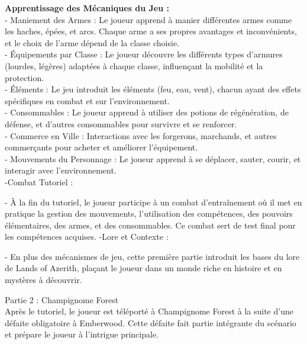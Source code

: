   \textbf{Apprentissage des Mécaniques du Jeu : }
  \\

  - Maniement des Armes : Le joueur apprend à manier différentes armes comme les haches, épées, et arcs. Chaque arme a ses propres avantages et inconvénients, et le choix de l'arme dépend de la classe choisie. 
\\

  - Équipements par Classe : Le joueur découvre les différents types d'armures (lourdes, légères) adaptées à chaque classe, influençant la mobilité et la protection. 
\\

  - Éléments : Le jeu introduit les éléments (feu, eau, vent), chacun ayant des effets spécifiques en combat et sur l'environnement. 
\\

  - Consommables : Le joueur apprend à utiliser des potions de régénération, de défense, et d'autres consommables pour survivre et se renforcer. 
\\

  - Commerce en Ville : Interactions avec les forgerons, marchands, et autres commerçants pour acheter et améliorer l'équipement. 
\\

  -  Mouvements du Personnage : Le joueur apprend à se déplacer, sauter, courir, et interagir avec l'environnement. 
  \\

-Combat Tutoriel : 

  - À la fin du tutoriel, le joueur participe à un combat d'entraînement où il met en pratique la gestion des mouvements, l'utilisation des compétences, des pouvoirs élémentaires, des armes, et des consommables. Ce combat sert de test final pour les compétences acquises. 
-Lore et Contexte :

  - En plus des mécanismes de jeu, cette première partie introduit les bases du lore de Lands of Azerith, plaçant le joueur dans un monde riche en histoire et en mystères à découvrir. 



Partie 2 : Champignome Forest 
\\
 

Après le tutoriel, le joueur est téléporté à Champignome Forest à la suite d'une défaite obligatoire à Emberwood. Cette défaite fait partie intégrante du scénario et prépare le joueur à l'intrigue principale. 

  

